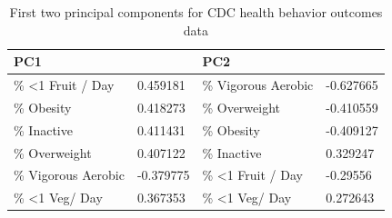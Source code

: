 \documentclass{article}
\begin{document}
\onecolumn
\begin{table}[]
\centering
\caption{First two principal components for CDC health behavior outcomes data}
\label{pcs_cdc}
\begin{tabular}{|l|l|l|l|}
\hline
\multicolumn{2}{|l|}{PC1}              & \multicolumn{2}{l|}{PC2}               \\ \hline
\% \textless 1 Fruit / Day & 0.459181  & \% Vigorous Aerobic        & -0.627665 \\ \hline
\% Obesity                 & 0.418273  & \% Overweight              & -0.410559 \\ \hline
\% Inactive                & 0.411431  & \% Obesity                 & -0.409127 \\ \hline
\% Overweight              & 0.407122  & \% Inactive                & 0.329247  \\ \hline
\% Vigorous Aerobic        & -0.379775 & \% \textless 1 Fruit / Day & -0.29556  \\ \hline
\% \textless 1 Veg/ Day    & 0.367353  & \% \textless 1 Veg/ Day    & 0.272643  \\ \hline
\end{tabular}
\end{table}
\end{document}
